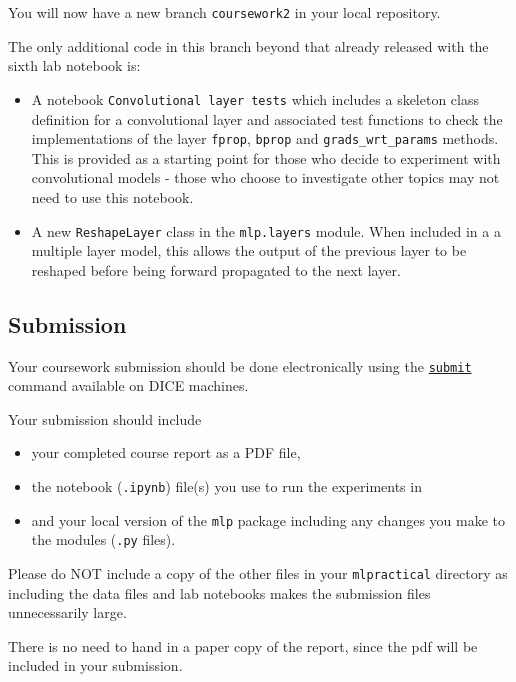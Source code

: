 \documentclass[11pt,]{article}
\begin{document}
You will now have a new branch \texttt{coursework2} in your local
repository.

The only additional code in this branch beyond that already released
with the sixth lab notebook is:

\begin{itemize}
\itemsep1pt\parskip0pt
\item
  A notebook \texttt{Convolutional layer tests} which includes a
  skeleton class definition for a convolutional layer and associated
  test functions to check the implementations of the layer
  \texttt{fprop}, \texttt{bprop} and \texttt{grads\_wrt\_params}
  methods. This is provided as a starting point for those who decide to
  experiment with convolutional models - those who choose to investigate
  other topics may not need to use this notebook.
\item
  A new \texttt{ReshapeLayer} class in the \texttt{mlp.layers} module.
  When included in a a multiple layer model, this allows the output of
  the previous layer to be reshaped before being forward propagated to
  the next layer.
\end{itemize}

\subsection{Submission}\label{submission}

Your coursework submission should be done electronically using the
\href{http://computing.help.inf.ed.ac.uk/submit}{\texttt{submit}}
command available on DICE machines.

Your submission should include

\begin{itemize}
\itemsep1pt\parskip0pt
\item
  your completed course report as a PDF file,
\item
  the notebook (\texttt{.ipynb}) file(s) you use to run the experiments
  in
\item
  and your local version of the \texttt{mlp} package including any
  changes you make to the modules (\texttt{.py} files).
\end{itemize}

Please do NOT include a copy of the other files in your
\texttt{mlpractical} directory as including the data files and lab
notebooks makes the submission files unnecessarily large.

There is no need to hand in a paper copy of the report, since the pdf
will be included in your submission.
\end{document}
